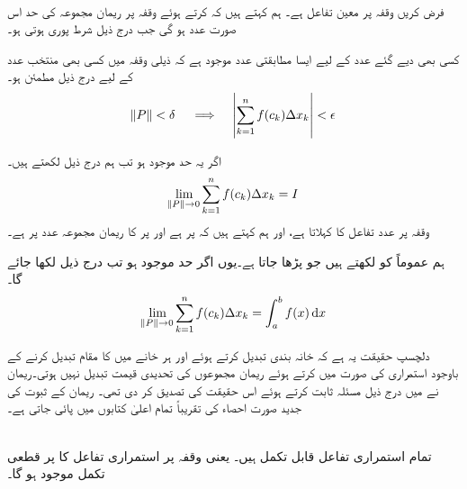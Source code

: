 \\
فرض کریں وقفہ  پر   معین تفاعل ہے۔ ہم کہتے ہیں کہ  کرتے ہوئے وقفہ  پر ریمان مجموعہ  کی حد اس صورت عدد  ہو گی جب درج ذیل شرط پوری ہوتی ہو۔

کسی بھی دیے گئے عدد  کے لیے ایسا مطابقتی عدد  موجود ہے کہ ذیلی وقفہ  میں کسی بھی منتخب عدد  کے لیے  درج ذیل مطمئن ہو۔
\begin{align*}
\norm{P}<\delta\quad\implies\quad \abs{\sum\limits_{k=1}^n f(c_k)\Delta x_k}<\epsilon
\end{align*}

اگر یہ حد موجود ہو تب ہم  درج ذیل لکھتے ہیں۔
\begin{align*}
\lim_{\norm{P}\to 0}\sum\limits_{k=1}^n f(c_k)\Delta x_k=I
\end{align*}
وقفہ  پر  عدد  تفاعل   کا  کہلاتا ہے، اور ہم کہتے ہیں کہ  پر   ہے اور  پر  کا ریمان مجموعہ عدد  پر  ہے۔

ہم عموماً  کو  لکھتے ہیں جو  پڑھا جاتا ہے۔یوں اگر حد موجود ہو تب درج ذیل لکھا جائے گا۔
\begin{align*}
\lim_{\norm{P}\to 0}\sum\limits_{k=1}^nf(c_k)\Delta x_k=\int_a^bf(x)\dif x
\end{align*}

دلچسپ حقیقت یہ ہے کہ خانہ بندی تبدیل کرتے ہوئے اور ہر خانے میں  کا مقام تبدیل کرنے کے باوجود استمراری  کی صورت میں   کرتے ہوئے ریمان مجموعوں  کی تحدیدی قیمت تبدیل نہیں ہوتی۔ریمان نے  میں درج ذیل مسئلہ ثابت کرتے ہوئے اس حقیقت کی تصدیق کر دی تھی۔ ریمان کے ثبوت کی جدید صورت احصاء کی تقریباً تمام اعلیٰ  کتابوں میں پائی  جاتی ہے۔

\\
تمام استمراری تفاعل قابل تکمل ہیں۔ یعنی وقفہ  پر استمراری تفاعل  کا  پر قطعی تکمل موجود ہو گا۔


